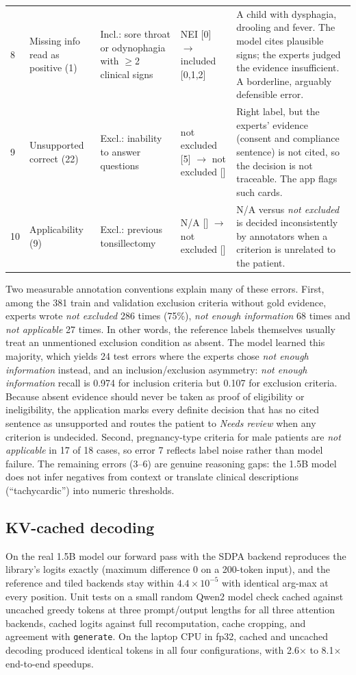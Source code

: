 \documentclass[conference]{IEEEtran}
\begin{document}
\begin{table}[t]
\begin{tabular}{p{0.3cm}p{2.6cm}p{4.5cm}p{3.1cm}p{5.4cm}}
8 & Missing info read as positive (1) & Incl.: sore throat or odynophagia with $\geq$2 clinical signs & NEI [0] $\to$ included [0,1,2] & A child with dysphagia, drooling and fever. The model cites plausible signs; the experts judged the evidence insufficient. A borderline, arguably defensible error. \\
9 & Unsupported correct (22) & Excl.: inability to answer questions & not excluded [5] $\to$ not excluded [] & Right label, but the experts' evidence (consent and compliance sentence) is not cited, so the decision is not traceable. The app flags such cards. \\
10 & Applicability (9) & Excl.: previous tonsillectomy & N/A [] $\to$ not excluded [] & N/A versus \emph{not excluded} is decided inconsistently by annotators when a criterion is unrelated to the patient. \\
\bottomrule
\end{tabular}
\end{table}

Two measurable annotation conventions explain many of these errors. First, among the 381 train and validation exclusion criteria without gold evidence, experts wrote \emph{not excluded} 286 times (75\%), \emph{not enough information} 68 times and \emph{not applicable} 27 times. In other words, the reference labels themselves usually treat an unmentioned exclusion condition as absent. The model learned this majority, which yields 24 test errors where the experts chose \emph{not enough information} instead, and an inclusion/exclusion asymmetry: \emph{not enough information} recall is 0.974 for inclusion criteria but 0.107 for exclusion criteria. Because absent evidence should never be taken as proof of eligibility or ineligibility, the application marks every definite decision that has no cited sentence as unsupported and routes the patient to \emph{Needs review} when any criterion is undecided. Second, pregnancy-type criteria for male patients are \emph{not applicable} in 17 of 18 cases, so error 7 reflects label noise rather than model failure. The remaining errors (3--6) are genuine reasoning gaps: the 1.5B model does not infer negatives from context or translate clinical descriptions (``tachycardic'') into numeric thresholds.

\subsection{KV-cached decoding}\label{sec:kvres}
On the real 1.5B model our forward pass with the SDPA backend reproduces the library's logits exactly (maximum difference 0 on a 200-token input), and the reference and tiled backends stay within $4.4\times10^{-5}$ with identical arg-max at every position. Unit tests on a small random Qwen2 model check cached against uncached greedy tokens at three prompt/output lengths for all three attention backends, cached logits against full recomputation, cache cropping, and agreement with \texttt{generate}. On the laptop CPU in fp32, cached and uncached decoding produced identical tokens in all four configurations, with 2.6$\times$ to 8.1$\times$ end-to-end speedups.
\end{document}
